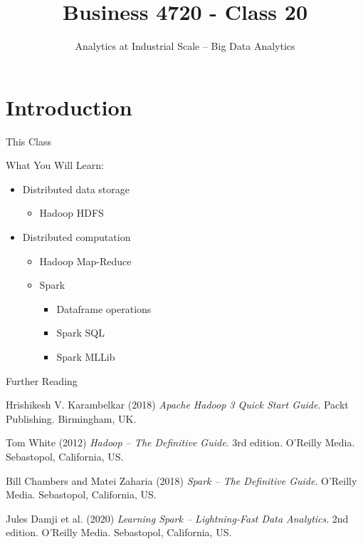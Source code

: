 \documentclass[ignorenonframetext,xcolor=x11names]{beamer}
\title{Business 4720 - Class 20}
\subtitle{Analytics at Industrial Scale -- Big Data Analytics}
\begin{document}
\begin{frame}{}
  \titlepage
  \footnotesize
  
\end{frame}

\section{Introduction}

\begin{frame}{This Class}

\begin{block}{What You Will Learn:}
\begin{itemize}
  \item Distributed data storage
  \begin{itemize}
     \item Hadoop HDFS
  \end{itemize}
  \item Distributed computation
  \begin{itemize}
     \item Hadoop Map-Reduce
     \item Spark
     \begin{itemize}
        \item Dataframe operations
        \item Spark SQL
        \item Spark MLLib
     \end{itemize}
   \end{itemize}
\end{itemize}
\end{block}
\end{frame}

\begin{frame}{Further Reading}
\begin{block}{}
Hrishikesh V. Karambelkar (2018) \emph{Apache Hadoop 3 Quick Start Guide}. Packt Publishing. Birmingham, UK.
\end{block}

\begin{block}{}
Tom White (2012) \emph{Hadoop -- The Definitive Guide}. 3rd edition. O'Reilly Media. Sebastopol, California, US.
\end{block}

\begin{block}{}
Bill Chambers and Matei Zaharia (2018) \emph{Spark -- The Definitive Guide}. O'Reilly Media. Sebastopol, California, US.
\end{block}

\begin{block}{}
Jules Damji et al. (2020) \emph{Learning Spark -- Lightning-Fast Data Analytics}. 2nd edition. O'Reilly Media. Sebastopol, California, US.
\end{block}
\end{frame}
\end{document}
